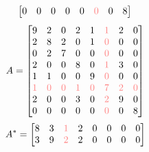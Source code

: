 \documentclass[xcolor=x11names,compress]{beamer}
\begin{document}
\begin{frame}
\begin{columns}
\begin{overprint}
\[\begin{bmatrix}
					0                     & 0                     & 0                     & 0                  & 0                     & \textcolor{red!50}{0} & 0                     & 8
				\end{bmatrix}
			\]
			\onslide<3>\[ A =
				\begin{bmatrix}
					9                     & 2                     & 0                     & 2                     & 1                     & \textcolor{red!50}{1} & 2                     & 0                     \\
					2                     & 8                     & 2                     & 0                     & 1                     & \textcolor{red!50}{0} & 0                     & 0                     \\
					0                     & 2                     & 7                     & 0                     & 0                     & \textcolor{red!50}{0} & 0                     & 0                     \\
					2                     & 0                     & 0                     & 8                     & 0                     & \textcolor{red!50}{1} & 3                     & 0                     \\
					1                     & 1                     & 0                     & 0                     & 9                     & \textcolor{red!50}{0} & 0                     & 0                     \\
					\textcolor{red!50}{1} & \textcolor{red!50}{0} & \textcolor{red!50}{0} & \textcolor{red!50}{1} & \textcolor{red!50}{0} & \textcolor{red!50}{7} & \textcolor{red!50}{2} & \textcolor{red!50}{0} \\
					2                     & 0                     & 0                     & 3                     & 0                     & \textcolor{red!50}{2} & 9                     & 0                     \\
					0                     & 0                     & 0                     & 0                     & 0                     & \textcolor{red!50}{0} & 0                     & 8
				\end{bmatrix}
			\]
			\onslide<4>\[ A^{\ast} =
				\begin{bmatrix}
					8                     & 3                     & \textcolor{red!50}{1} & 2                     & 0                     & 0                     & 0                     & 0                     \\
					3                     & 9                     & \textcolor{red!50}{2} & 2                     & 0                     & 0                     & 0                     & 0                     \\

\end{bmatrix}\]
\end{overprint}
\end{columns}
\end{frame}
\end{document}
